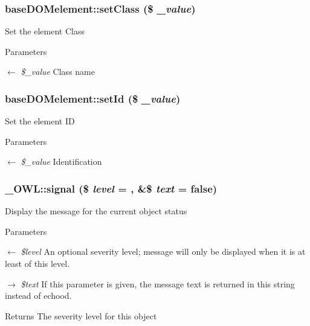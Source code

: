 \subsubsection[{setClass}]{\setlength{\rightskip}{0pt plus 5cm}baseDOMelement::setClass (\$ {\em \_\-value})}\label{classbaseDOMelement_a18849fdddb0e33281d59cf069eb9df74}
Set the element Class 
\begin{DoxyParams}{Parameters}
\item[\mbox{$\leftarrow$} {\em \$\_\-value}]Class name \end{DoxyParams}
\subsubsection[{setId}]{\setlength{\rightskip}{0pt plus 5cm}baseDOMelement::setId (\$ {\em \_\-value})}\label{classbaseDOMelement_ad678d9e47e7164c759270b5a1631a61c}
Set the element ID 
\begin{DoxyParams}{Parameters}
\item[\mbox{$\leftarrow$} {\em \$\_\-value}]Identification \end{DoxyParams}
\subsubsection[{signal}]{\setlength{\rightskip}{0pt plus 5cm}\_\-OWL::signal (\$ {\em level} = {}, \/  \&\$ {\em text} = {\ttfamily false})}\label{class__OWL_a51ba4a16409acf2a2f61f286939091a5}
Display the message for the current object status


\begin{DoxyParams}{Parameters}
\item[\mbox{$\leftarrow$} {\em \$level}]An optional severity level; message will only be displayed when it is at least of this level. \item[\mbox{$\rightarrow$} {\em \$text}]If this parameter is given, the message text is returned in this string instead of echood. \end{DoxyParams}
\begin{DoxyReturn}{Returns}
The severity level for this object 
\end{DoxyReturn}


